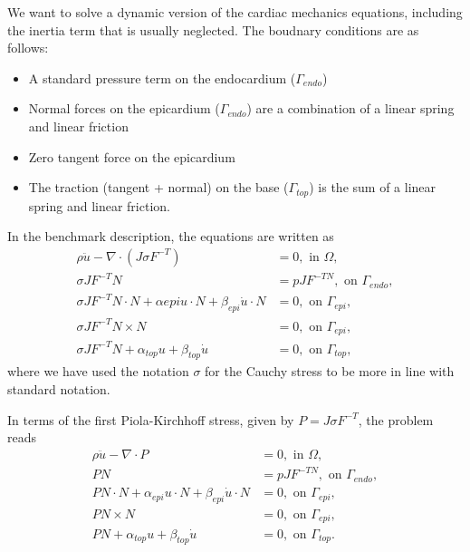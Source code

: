 \documentclass[a4paper,10pt]{article}
\begin{document}
We want to solve a dynamic version of the cardiac mechanics equations, including the
inertia term that is usually neglected. The boudnary conditions are as follows:
\begin{itemize}
\item A standard pressure term on the endocardium ($\Gamma_{endo}$)
\item Normal forces on the epicardium ($\Gamma_{endo}$) are a combination of a linear spring
and linear friction
\item Zero tangent force on the epicardium
\item The traction (tangent + normal) on the base ($\Gamma_{top}$) is the sum of
a linear spring and linear friction.
\end{itemize}
In the benchmark description, the equations are written as
\begin{align*}
  \rho \ddot{u} - \nabla\cdot(J\sigma F^{-T}) &= 0, \mbox{ in } \Omega ,\\
  \sigma J F^{-T}N &= pJF^{-TN}, \mbox{ on } \Gamma_{endo}, \\
  \sigma JF^{-T}N\cdot N + \alpha{epi}u\cdot N + \beta_{epi}\dot{u}\cdot N &= 0, \mbox{ on }  \Gamma_{epi}, \\
  \sigma JF^{-T}N\times N &=0, \mbox{ on }  \Gamma_{epi}, \\
  \sigma JF^{-T}N + \alpha_{top}u + \beta_{top}\dot{u} &= 0, \mbox{ on } \Gamma_{top},
\end{align*}
where we have used the notation $\sigma$ for the Cauchy stress to be more in line with standard notation.

In terms of the first Piola-Kirchhoff stress, given by $P = J\sigma F^{-T}$, the problem reads
\begin{align}
  \rho \ddot{u} - \nabla\cdot P &= 0, \mbox{ in } \Omega ,\label{dyn_eq0}\\
  PN &= pJF^{-TN}, \mbox{ on } \Gamma_{endo}, \\
  PN\cdot N + \alpha_{epi}u\cdot N + \beta_{epi}\dot{u}\cdot N &= 0, \mbox{ on }  \Gamma_{epi}, \\
  PN\times N &=0, \mbox{ on }  \Gamma_{epi}, \\
  PN + \alpha_{top}u + \beta_{top}\dot{u} &= 0, \mbox{ on } \Gamma_{top}.\label{dyn_bc3}
\end{align}
\end{document}
